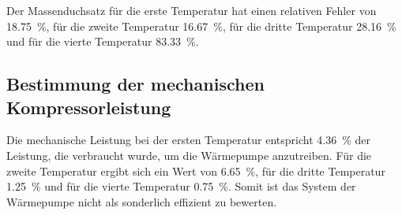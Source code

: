 \noindent Der Massenduchsatz für die erste Temperatur hat einen relativen Fehler von 
\SI{18.75}{\percent}, für die zweite Temperatur \SI{16.67}{\percent}, für die dritte 
Temperatur \SI{28.16}{\percent} und für die vierte Temperatur \SI{83.33}{\percent}. 

\subsection{Bestimmung der mechanischen Kompressorleistung}
Die mechanische Leistung bei der ersten Temperatur entspricht 
\SI{4.36}{\percent} der Leistung, die verbraucht wurde, um die Wärmepumpe 
anzutreiben. Für die zweite Temperatur ergibt sich ein Wert von \SI{6.65}{\percent}, 
für die dritte Temperatur \SI{1.25}{\percent} und für die vierte Temperatur 
\SI{0.75}{\percent}. 
Somit ist das System der Wärmepumpe nicht als sonderlich effizient zu bewerten.
